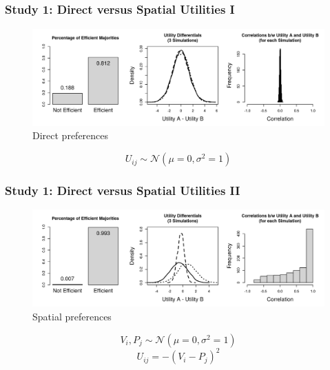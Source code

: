 \documentclass{beamer}
\begin{document}
\subsection{}
\begin{frame}%
  \frametitle{Study 1: Direct versus Spatial Utilities I}
  \begin{figure}[ht]\centering
    \includegraphics[width=\textwidth]{../simulations/fig/s1b.png}
    \caption{Direct preferences}
  \end{figure}
  $$ U_{ij} \sim \mathcal{N}(\mu=0,\sigma^2=1) $$
\end{frame}
\begin{frame}%
  \frametitle{Study 1: Direct versus Spatial Utilities II}
  \begin{figure}[ht]\centering
    \includegraphics[width=\textwidth]{../simulations/fig/s1a.png}
    \caption{Spatial preferences}
  \end{figure}
  	$$ V_i,P_j \sim \mathcal{N}(\mu=0,\sigma^2=1) $$
	$$ U_{ij} = -(V_i - P_j)^2 $$
\end{frame}
\end{document}

